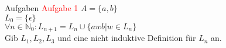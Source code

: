\begin{frame}{Aufgaben}
	\textcolor{red}{Aufgabe 1} $A=\{a,b\}$\\
	$L_{0}=\{\epsilon\}$\\
	$\forall n\in\mathbb{N}_{0}: L_{n+1}=L_{n}\cup \{awb\vert w\in L_{n}\}$\\
	Gib $L_{1}, L_{2}, L_{3}$ und eine nicht induktive Definition für $L_{n}$ an.%
\end{frame}
